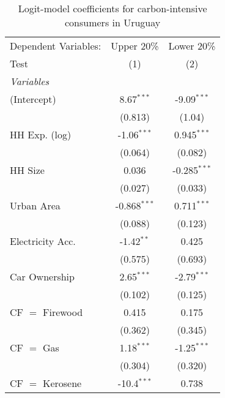 
\begin{table}[htbp!]
   \centering
   \small
   \begin{adjustbox}{width = 1\textwidth, max height = 0.95\textheight, center}
      \begin{threeparttable}[b]
         \caption{\label{tab:Logit_1_URY} Logit-model coefficients for carbon-intensive consumers in Uruguay}
         \begin{tabular}{lcc}
            \tabularnewline \midrule \midrule
            Dependent Variables: & Upper 20\%     & Lower 20\%\\   
            Test                 & (1)            & (2)\\  
            \midrule
            \emph{Variables}\\
            (Intercept)          & 8.67$^{***}$   & -9.09$^{***}$\\   
                                 & (0.813)        & (1.04)\\   
            HH Exp. (log)        & -1.06$^{***}$  & 0.945$^{***}$\\   
                                 & (0.064)        & (0.082)\\   
            HH Size              & 0.036          & -0.285$^{***}$\\   
                                 & (0.027)        & (0.033)\\   
            Urban Area           & -0.868$^{***}$ & 0.711$^{***}$\\   
                                 & (0.088)        & (0.123)\\   
            Electricity Acc.     & -1.42$^{**}$   & 0.425\\   
                                 & (0.575)        & (0.693)\\   
            Car Ownership        & 2.65$^{***}$   & -2.79$^{***}$\\   
                                 & (0.102)        & (0.125)\\   
            CF $=$ Firewood      & 0.415          & 0.175\\   
                                 & (0.362)        & (0.345)\\   
            CF $=$ Gas           & 1.18$^{***}$   & -1.25$^{***}$\\   
                                 & (0.304)        & (0.320)\\   
            CF $=$ Kerosene      & -10.4$^{***}$  & 0.738\\   

\end{tabular}
\end{threeparttable}
\end{adjustbox}
\end{table}
